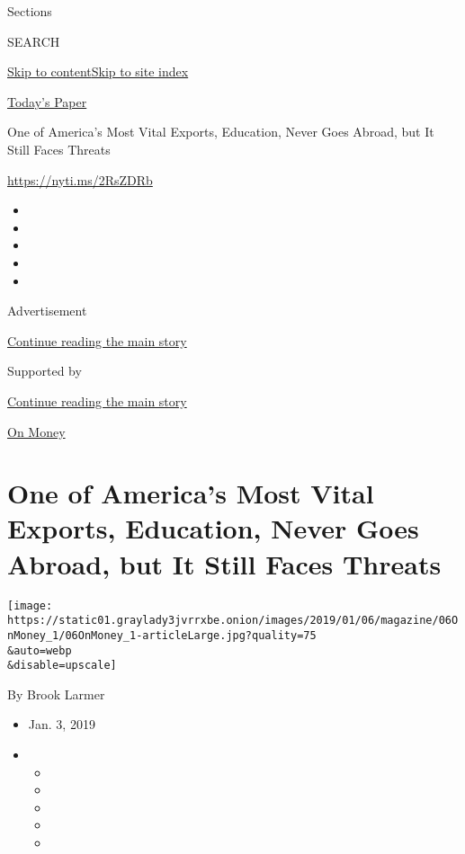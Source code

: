 Sections

SEARCH

\protect\hyperlink{site-content}{Skip to
content}\protect\hyperlink{site-index}{Skip to site index}

\href{https://myaccount.nytimes3xbfgragh.onion/auth/login?response_type=cookie\&client_id=vi}{}

\href{https://www.nytimes3xbfgragh.onion/section/todayspaper}{Today's
Paper}

One of America's Most Vital Exports, Education, Never Goes Abroad, but
It Still Faces Threats

\url{https://nyti.ms/2RsZDRb}

\begin{itemize}
\item
\item
\item
\item
\item
\end{itemize}

Advertisement

\protect\hyperlink{after-top}{Continue reading the main story}

Supported by

\protect\hyperlink{after-sponsor}{Continue reading the main story}

\href{/column/on-money}{On Money}

\hypertarget{one-of-americas-most-vital-exports-education-never-goes-abroad-but-it-still-faces-threats}{%
\section{One of America's Most Vital Exports, Education, Never Goes
Abroad, but It Still Faces
Threats}\label{one-of-americas-most-vital-exports-education-never-goes-abroad-but-it-still-faces-threats}}

\texttt{[image: https://static01.graylady3jvrrxbe.onion/images/2019/01/06/magazine/06OnMoney\_1/06OnMoney\_1-articleLarge.jpg?quality=75\\\&auto=webp\\\&disable=upscale]}

By Brook Larmer

\begin{itemize}
\item
  Jan. 3, 2019
\item
  \begin{itemize}
  \item
  \item
  \item
  \item
  \item
  \end{itemize}
\end{itemize}

